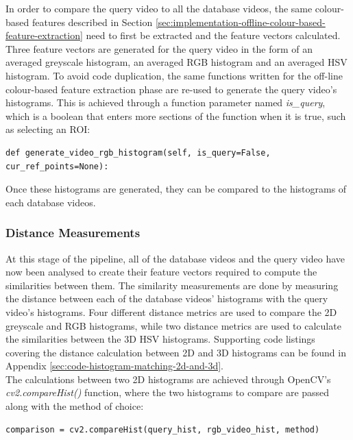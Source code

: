 In order to compare the query video to all the database videos, the same colour-based features described in Section \ref{sec:implementation-offline-colour-based-feature-extraction} need to first be extracted and the feature vectors calculated. Three feature vectors are generated for the query video in the form of an averaged greyscale histogram, an averaged RGB histogram and an averaged HSV histogram. To avoid code duplication, the same functions written for the off-line colour-based feature extraction phase are re-used to generate the query video's histograms. This is achieved through a function parameter named \textit{is\_query}, which is a boolean that enters more sections of the function when it is true, such as selecting an ROI:

\begin{lstlisting}[numbers=none]
def generate_video_rgb_histogram(self, is_query=False, cur_ref_points=None):
\end{lstlisting}

Once these histograms are generated, they can be compared to the histograms of each database videos.

\subsubsection{Distance Measurements}
\label{sec:implementation-distance-measurements}

At this stage of the pipeline, all of the database videos and the query video have now been analysed to create their feature vectors required to compute the similarities between them. The similarity measurements are done by measuring the distance between each of the database videos' histograms with the query video's histograms. Four different distance metrics are used to compare the 2D greyscale and RGB histograms, while two distance metrics are used to calculate the similarities between the 3D HSV histograms. Supporting code listings covering the distance calculation between 2D and 3D histograms can be found in Appendix \ref{sec:code-histogram-matching-2d-and-3d}.\\

The calculations between two 2D histograms are achieved through OpenCV's \textit{cv2.compareHist()} function, where the two histograms to compare are passed along with the method of choice:

\begin{lstlisting}[numbers=none]
comparison = cv2.compareHist(query_hist, rgb_video_hist, method)
\end{lstlisting}

